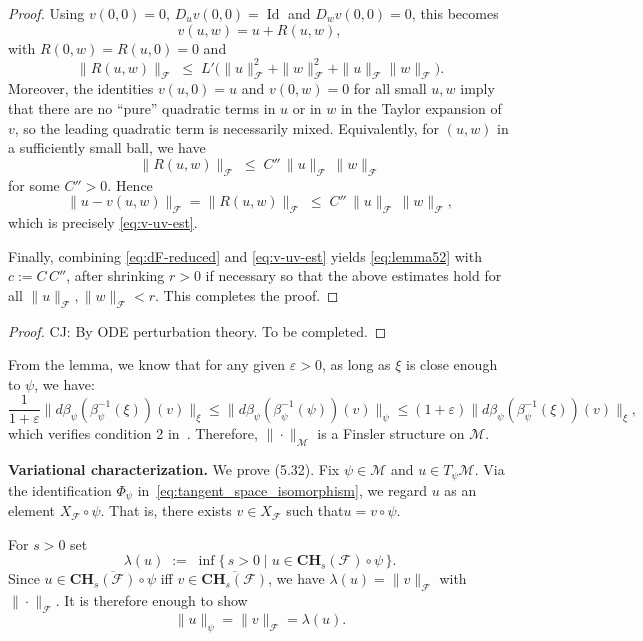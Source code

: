 \documentclass[12pt]{amsart}
\numberwithin{equation}{section}
\theoremstyle{remark}
\newcommand{\cjp}[1]{{\color{orange} CJ: \footnotesize #1}}
\begin{document}
\begin{proof}
Using $v(0,0)=0$, $D_u v(0,0)=\operatorname{Id}$ and $D_w v(0,0)=0$, this becomes
\[
  v(u,w) = u + R(u,w),
\]
with $R(0,w)=R(u,0)=0$ and
\[
  \|R(u,w)\|_{\mathcal F}
  \;\le\; L'\bigl(\|u\|_{\mathcal F}^2
                 + \|w\|_{\mathcal F}^2
                 + \|u\|_{\mathcal F}\|w\|_{\mathcal F}\bigr).
\]
Moreover, the identities $v(u,0)=u$ and $v(0,w)=0$ for all small
$u,w$ imply that there are no ``pure'' quadratic terms in $u$ or in
$w$ in the Taylor expansion of $v$, so the leading quadratic term is
necessarily mixed. Equivalently, for $(u,w)$ in a sufficiently small
ball, we have
\[
  \|R(u,w)\|_{\mathcal F}
  \;\le\; C''\,\|u\|_{\mathcal F}\,\|w\|_{\mathcal F}
\]
for some $C''>0$. Hence
\[
  \|u-v(u,w)\|_{\mathcal F}
  = \|R(u,w)\|_{\mathcal F}
  \;\le\; C''\,\|u\|_{\mathcal F}\,\|w\|_{\mathcal F},
\]
which is precisely \eqref{eq:v-uv-est}.

Finally, combining \eqref{eq:dF-reduced} and \eqref{eq:v-uv-est}
yields \eqref{eq:lemma52} with $c := C\,C''$, after shrinking $r>0$
if necessary so that the above estimates hold for all
$\|u\|_{\mathcal F},\|w\|_{\mathcal F}<r$. This completes the proof.
\end{proof}
\begin{proof}
    \cjp{By ODE perturbation theory. To be completed.}
\end{proof}
From the lemma, we know that for any given $\varepsilon>0$, as long as $\xi$ is close enough to $\psi$, we have:
\begin{equation}
\frac{1}{1+\varepsilon }\|d\beta_\psi(\beta_\psi^{-1}(\xi))(v)\|_\xi \le \|d\beta_\psi(\beta_\psi^{-1}(\psi))(v)\|_\psi \le (1+\varepsilon) \|d\beta_\psi(\beta_\psi^{-1}(\xi))(v)\|_\xi,
\end{equation}
which verifies condition 2 in~.
Therefore, $\|\cdot\|_{\mathcal M}$ is a Finsler structure on $\mathcal M$.



\textbf{Variational characterization.}
We prove (5.32). Fix $\psi\in\mathcal M$ and $u\in T_\psi\mathcal M$.
Via the identification $\Phi_\psi$ in~\eqref{eq:tangent_space_isomorphism}, we regard $u$ as an element
$X_{\mathcal F}\circ \psi$. That is, there exists $v\in X_{\mathcal F}$ such that$
u = v\circ\psi.$

For $s>0$ set
\[
\lambda(u)\;:=\;\inf\{\,s>0 \mid u\in \mathbf{CH}_s(\mathcal F)\circ\psi\,\}.
\]
Since $u\in \overline{\mathbf{CH}_s(\mathcal F)\circ\psi}$ iff $v\in \overline{\mathbf{CH}_s(\mathcal F)}$,
we have $\lambda(u)=\|v\|_{\mathcal F}$ with $\|\cdot\|_{\mathcal F}$.
It is therefore enough to show
\begin{equation}
\|u\|_\psi = \|v\|_{\mathcal F} = \lambda(u).
\end{equation}
\end{document}
